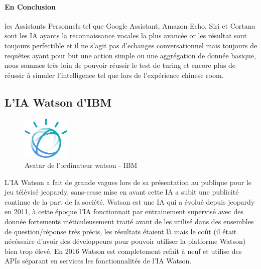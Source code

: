 \paragraph{En Conclusion} les Assistants Personnels tel que Google Assistant, Amazon Echo, Siri et
Cortana sont les IA ayants la reconnaissance vocales la plus avancée or les résultat sont toujours
perfectible et il ne s'agit pas d'echanges conversationnel mais toujours de requêtes
ayant pour but une action simple ou une aggrégation de donnée basique, nous sommes très loin
de pouvoir réussir le test de turing et encore plus de réussir à simuler l'intelligence tel que
lors de l'expérience chinese room.




\subsection{L'IA Watson d'IBM}
\begin{figure}[H]
    \centering
    \includegraphics[width=0.2\textwidth]{Images/watsonlogo}
    \caption{Avatar de l'ordinateur watson - IBM}
    \label{fig:watsonlogo}
\end{figure}

L'IA Watson a fait de grande vagues lors de sa présentation au publique pour le jeu télévisé jeopardy,
sans-cesse mise en avant cette IA a subit une publicité continue de la part de la société.
Watson est une IA qui a évolué depuis jeopardy en 2011, à cette époque l'IA fonctionnait
par entrainement supervisé avec des donnée fortements méticuleusement traité avant de les utilisé
dans des ensembles de question/réponse très précis, les résultats étaient là mais le coût (il était
nécéssaire d'avoir des développeurs pour pouvoir utiliser la platforme Watson) bien trop élevé.
En 2016 Watson est completement refait à neuf et utilise des \gls{API}s séparant en services
les fonctionnalités de l'IA Watson. \newline

